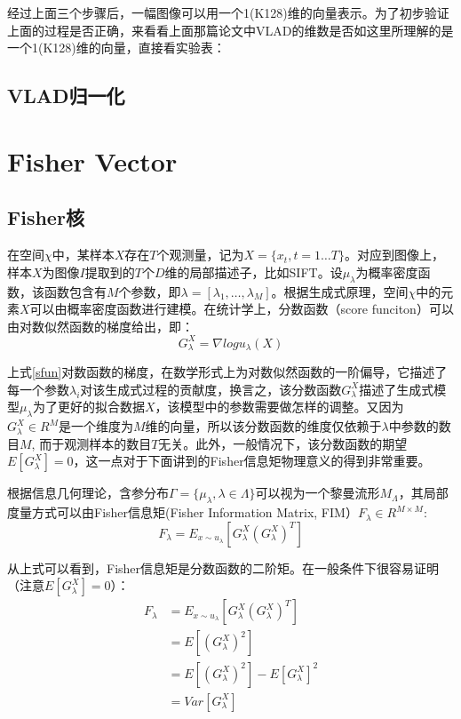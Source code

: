 \documentclass[color=cyan,mathpazo,titlestyle=hang]{elegantbook}
\begin{document}
经过上面三个步骤后，一幅图像可以用一个1(K128)维的向量表示。为了初步验证上面的过程是否正确，来看看上面那篇论文中VLAD的维数是否如这里所理解的是一个1(K128)维的向量，直接看实验表：

\subsection{VLAD归一化}

\section{Fisher Vector}

\subsection{Fisher核}

在空间$\chi$中，某样本$X$存在$T$个观测量，记为$X = \lbrace x_t, t=1 \dots T \rbrace$。对应到图像上，样本$X$为图像$I$提取到的$T$个$D$维的局部描述子，比如SIFT。设$\mu_\lambda$为概率密度函数，该函数包含有$M$个参数，即$\lambda = [\lambda_1, \dots, \lambda_M]$。根据生成式原理，空间$\chi$中的元素$X$可以由概率密度函数进行建模。在统计学上，分数函数（score funciton）可以由对数似然函数的梯度给出，即：
\begin{equation}
G^X_\lambda = \nabla log u_\lambda(X)
\label{sfun}
\end{equation}

上式\eqref{sfun}对数函数的梯度，在数学形式上为对数似然函数的一阶偏导，它描述了每一个参数$\lambda_i$对该生成式过程的贡献度，换言之，该分数函数$G^X_\lambda$描述了生成式模型$\mu_\lambda$为了更好的拟合数据$X$，该模型中的参数需要做怎样的调整。又因为$G^X_\lambda \in R^M $是一个维度为$M$维的向量，所以该分数函数的维度仅依赖于$\lambda $中参数的数目$M$, 而于观测样本的数目$T$无关。此外，一般情况下，该分数函数的期望$E[ G^X_\lambda ] = 0 $，这一点对于下面讲到的Fisher信息矩物理意义的得到非常重要。

根据信息几何理论，含参分布$\Gamma = \lbrace \mu_\lambda, \lambda \in \Lambda \rbrace$可以视为一个黎曼流形$M_\Lambda$，其局部度量方式可以由Fisher信息矩(Fisher Information Matrix, FIM）$F_\lambda \in R^{M \times M}$:
\begin{equation}
F_{\lambda} = E_{ x \sim u_\lambda } [ G^X_\lambda (G^X_\lambda)^T ]
\label{fim}
\end{equation}

从上式可以看到，Fisher信息矩是分数函数的二阶矩。在一般条件下很容易证明（注意$E[ G^X_\lambda ] = 0 $）：
\begin{equation}
\begin{split}
F_{\lambda} &= E_{ x \sim u_\lambda } [ G^X_\lambda (G^X_\lambda)^T ] \\
            &= E[(G^X_\lambda)^2] \\
            &= E[(G^X_\lambda)^2] - E[ G^X_\lambda ]^2 \\
            &= Var[G^X_\lambda]
\end{split}
\label{fim1}
\end{equation}
\end{document}
